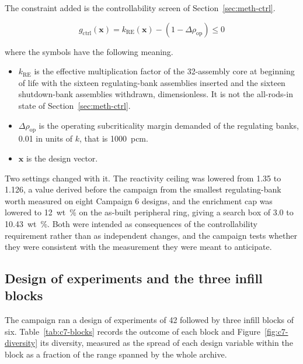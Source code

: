 The constraint added is the controllability screen of
Section~\ref{sec:meth-ctrl}.

\begin{equation}
g_\mathrm{ctrl}(\mathbf{x}) = k_\mathrm{RE}(\mathbf{x}) - (1 - \Delta\rho_\mathrm{op}) \le 0
\label{eq:g-ctrl}
\end{equation}

\noindent where the symbols have the following meaning.

\begin{itemize}
  \item $k_\mathrm{RE}$ is the effective multiplication factor of the
        32-assembly core at beginning of life with the sixteen
        regulating-bank assemblies inserted and the sixteen
        shutdown-bank assemblies withdrawn, dimensionless. It is not
        the all-rods-in state of Section~\ref{sec:meth-ctrl}.

  \item $\Delta\rho_\mathrm{op}$ is the operating subcriticality margin
        demanded of the regulating banks, \num{0.01} in units of $k$,
        that is \SI{1000}{pcm}.

  \item $\mathbf{x}$ is the design vector.
\end{itemize}

Two settings changed with it. The reactivity ceiling was lowered from
1.35 to 1.126, a value derived before the campaign from the smallest
regulating-bank worth measured on eight Campaign 6 designs, and the
enrichment cap was lowered to \SI{12}{wt\%} on the as-built peripheral
ring, giving a search box of 3.0 to \SI{10.43}{wt\%}. Both were
intended as consequences of the controllability requirement rather than
as independent changes, and the campaign tests whether they were
consistent with the measurement they were meant to anticipate.

\subsection{Design of experiments and the three infill blocks}
\label{sec:res-c7-blocks}

The campaign ran a design of experiments of 42 followed by three infill
blocks of six. Table~\ref{tab:c7-blocks} records the outcome of each
block and Figure~\ref{fig:c7-diversity} its diversity, measured as the
spread of each design variable within the block as a fraction of the
range spanned by the whole archive.

